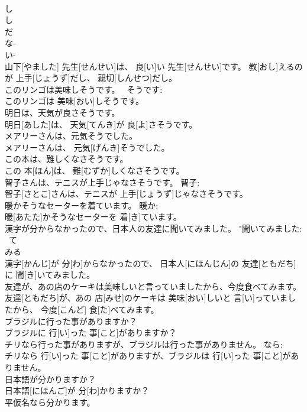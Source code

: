 \documentclass[8pt]{extreport}
\begin{document}
\begin{CJK}{UTF8}{min}
\\	し 
\\	し 
\\	だ 
\\	な-
\\	い- 
\\	山下[やました] 先生[せんせい]は、 良[い]い 先生[せんせい]です。 教[おし]えるのが 上手[じょうず]だし、 親切[しんせつ]だし。	
\\	このリンゴは美味しそうです。	~そうです: 
\\	このリンゴは 美味[おい]しそうです。	
\\	明日は、天気が良さそうです。	
\\	明日[あした]は、 天気[てんき]が 良[よ]さそうです。	
\\	メアリーさんは、元気そうでした。	
\\	メアリーさんは、 元気[げんき]そうでした。	
\\	この本は、難しくなさそうです。	
\\	この 本[ほん]は、 難[むずか]しくなさそうです。	
\\	智子さんは、テニスが上手じゃなさそうです。	智子: 
\\	智子[さとこ]さんは、テニスが 上手[じょうず]じゃなさそうです。	
\\	暖かそうなセーターを着ています。	暖か: 
\\	暖[あたた]かそうなセーターを 着[き]ています。	
\\	漢字が分からなかったので、日本人の友達に聞いてみました。	"聞いてみました: 
\\	~て 
\\	みる 
\\	漢字[かんじ]が 分[わ]からなかったので、 日本人[にほんじん]の 友達[ともだち]に 聞[き]いてみました。	
\\	友達が、あの店のケーキは美味しいと言っていましたから、今度食べてみます。		友達[ともだち]が、あの 店[みせ]のケーキは 美味[おい]しいと 言[い]っていましたから、 今度[こんど] 食[た]べてみます。	
\\	ブラジルに行った事がありますか？	
\\	ブラジルに 行[い]った 事[こと]がありますか？	
\\	チリなら行った事がありますが、ブラジルは行った事がありません。	なら: 
\\	チリなら 行[い]った 事[こと]がありますが、ブラジルは 行[い]った 事[こと]がありません。	
\\	日本語が分かりますか？	
\\	日本語[にほんご]が 分[わ]かりますか？	
\\	平仮名なら分かります。	

\end{CJK}
\end{document}

